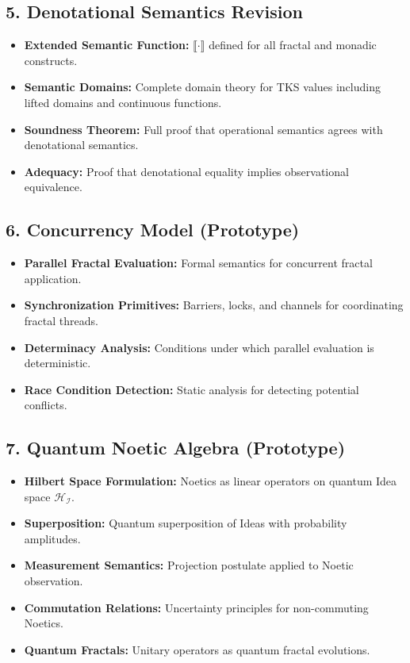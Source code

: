 \documentclass[11pt,twoside,openright]{book}
\theoremstyle{definition}
\theoremstyle{plain}
\theoremstyle{remark}
\newcommand{\sem}[1]{\llbracket #1 \rrbracket}
\newcommand{\Ideas}{\mathcal{I}}
\newcommand{\Hspace}{\mathcal{H}}
\begin{document}
\subsection*{5. Denotational Semantics Revision}

\begin{itemize}
  \item \textbf{Extended Semantic Function:} $\sem{\cdot}$ defined for all fractal and monadic constructs.
  \item \textbf{Semantic Domains:} Complete domain theory for TKS values including lifted domains and continuous functions.
  \item \textbf{Soundness Theorem:} Full proof that operational semantics agrees with denotational semantics.
  \item \textbf{Adequacy:} Proof that denotational equality implies observational equivalence.
\end{itemize}

\subsection*{6. Concurrency Model (Prototype)}

\begin{itemize}
  \item \textbf{Parallel Fractal Evaluation:} Formal semantics for concurrent fractal application.
  \item \textbf{Synchronization Primitives:} Barriers, locks, and channels for coordinating fractal threads.
  \item \textbf{Determinacy Analysis:} Conditions under which parallel evaluation is deterministic.
  \item \textbf{Race Condition Detection:} Static analysis for detecting potential conflicts.
\end{itemize}

\subsection*{7. Quantum Noetic Algebra (Prototype)}

\begin{itemize}
  \item \textbf{Hilbert Space Formulation:} Noetics as linear operators on quantum Idea space $\Hspace_\Ideas$.
  \item \textbf{Superposition:} Quantum superposition of Ideas with probability amplitudes.
  \item \textbf{Measurement Semantics:} Projection postulate applied to Noetic observation.
  \item \textbf{Commutation Relations:} Uncertainty principles for non-commuting Noetics.
  \item \textbf{Quantum Fractals:} Unitary operators as quantum fractal evolutions.
\end{itemize}
\end{document}
